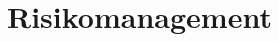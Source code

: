 \documentclass[11pt,a4paper]{article}
\begin{document}

\section{Risikomanagement}





\end{document}
